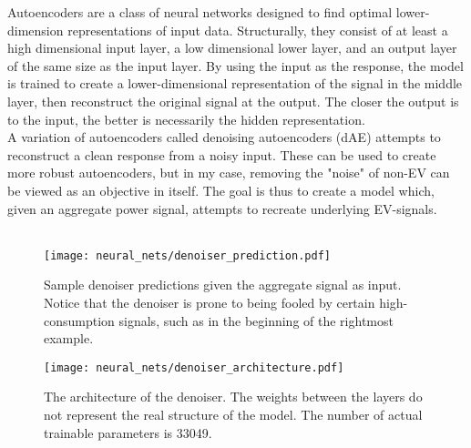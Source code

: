 \documentclass[12pt, american]{report}
\begin{document}
Autoencoders are a class of neural networks designed to find optimal lower-dimension representations of input data. Structurally, they consist of at least a high dimensional input layer, a low dimensional lower layer, and an output layer of the same size as the input layer. By using the input as the response, the model is trained to create a lower-dimensional representation of the signal in the middle layer, then reconstruct the original signal at the output. The closer the output is to the input, the better is necessarily the hidden representation.\\
A variation of autoencoders called denoising autoencoders (dAE) attempts to reconstruct a clean response from a noisy input. These can be used to create more robust autoencoders, but in my case, removing the "noise" of non-EV can be viewed as an objective in itself. The goal is thus to create a model which, given an aggregate power signal, attempts to recreate underlying EV-signals.\\
\\

\begin{figure}[h]
\centering
\caption{Sample denoiser predictions given the aggregate signal as input. Notice that the denoiser is prone to being fooled by certain high-consumption signals, such as in the beginning of the rightmost example.}
\label{fig:denoiser_output}
\texttt{[image: neural\_nets/denoiser\_prediction.pdf]}
\end{figure}

\begin{figure}[h]
\centering
\caption{The architecture of the denoiser. The weights between the layers do not represent the real structure of the model. The number of actual trainable parameters is 33049.}
\label{fig:denoiser_architecture}
\texttt{[image: neural\_nets/denoiser\_architecture.pdf]}
\end{figure}
\end{document}
